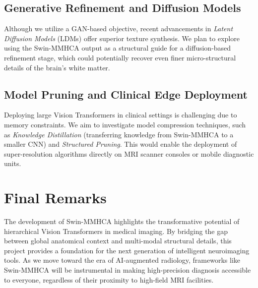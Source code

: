 \subsection{Generative Refinement and Diffusion Models}
Although we utilize a GAN-based objective, recent advancements in \textit{Latent Diffusion Models} (LDMs) offer superior texture synthesis. We plan to explore using the Swin-MMHCA output as a structural guide for a diffusion-based refinement stage, which could potentially recover even finer micro-structural details of the brain's white matter.

\subsection{Model Pruning and Clinical Edge Deployment}
Deploying large Vision Transformers in clinical settings is challenging due to memory constraints. We aim to investigate model compression techniques, such as \textit{Knowledge Distillation} (transferring knowledge from Swin-MMHCA to a smaller CNN) and \textit{Structured Pruning}. This would enable the deployment of super-resolution algorithms directly on MRI scanner consoles or mobile diagnostic units.

\section{Final Remarks}
The development of Swin-MMHCA highlights the transformative potential of hierarchical Vision Transformers in medical imaging. By bridging the gap between global anatomical context and multi-modal structural details, this project provides a foundation for the next generation of intelligent neuroimaging tools. As we move toward the era of AI-augmented radiology, frameworks like Swin-MMHCA will be instrumental in making high-precision diagnosis accessible to everyone, regardless of their proximity to high-field MRI facilities.
